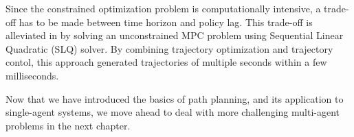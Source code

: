 Since the constrained optimization problem is computationally intensive, a trade-off has to be made between time horizon and policy lag. This trade-off is alleviated in \cite{neunert2016fast} by solving an unconstrained MPC problem using Sequential Linear Quadratic (SLQ) solver. By combining trajectory optimization and trajectory contol, this approach generated trajectories of multiple seconds within a few milliseconds.

Now that we have introduced the basics of path planning, and its application to single-agent systems, we move ahead to deal with more challenging multi-agent problems in the next chapter. 
















